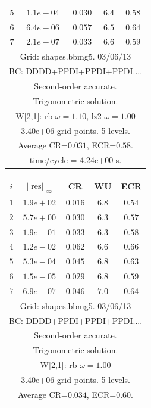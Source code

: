 \begin{table}[hbt]
\begin{center}
{\begin{tabular}{|c|c|c|c|c|}
 $ 5$  & $ 1.1e-04$ & $0.030$ & $ 6.4$ & $0.58$ \\ 
 $ 6$  & $ 6.4e-06$ & $0.057$ & $ 6.5$ & $0.64$ \\ 
 $ 7$  & $ 2.1e-07$ & $0.033$ & $ 6.6$ & $0.59$ \\ 
\hline 
\multicolumn{5}{|c|}{Grid: shapes.bbmg5. 03/06/13}  \\
\multicolumn{5}{|c|}{BC: DDDD+PPDI+PPDI+PPDI....}  \\
\multicolumn{5}{|c|}{Second-order accurate.}  \\
\multicolumn{5}{|c|}{Trigonometric solution.}  \\
\multicolumn{5}{|c|}{W[2,1]: rb $\omega=1.10$, lz2 $\omega=1.00$}  \\
\multicolumn{5}{|c|}{3.40e+06 grid-points. 5 levels.}  \\
\multicolumn{5}{|c|}{Average CR=$0.031$, ECR=$0.58$.}  \\
\multicolumn{5}{|c|}{time/cycle = 4.24e+00 s.}  \\
\hline 
\end{tabular}
\begin{tabular}{|c|c|c|c|c|} \hline 
 $i$   & $\vert\vert\mbox{res}\vert\vert_\infty$  &  CR     &  WU    & ECR  \\   \hline 
 $ 1$  & $ 1.9e+02$ & $0.016$ & $ 6.8$ & $0.54$ \\ 
 $ 2$  & $ 5.7e+00$ & $0.030$ & $ 6.3$ & $0.57$ \\ 
 $ 3$  & $ 1.9e-01$ & $0.033$ & $ 6.3$ & $0.58$ \\ 
 $ 4$  & $ 1.2e-02$ & $0.062$ & $ 6.6$ & $0.66$ \\ 
 $ 5$  & $ 5.3e-04$ & $0.045$ & $ 6.8$ & $0.63$ \\ 
 $ 6$  & $ 1.5e-05$ & $0.029$ & $ 6.8$ & $0.59$ \\ 
 $ 7$  & $ 6.9e-07$ & $0.046$ & $ 7.0$ & $0.64$ \\ 
\hline 
\multicolumn{5}{|c|}{Grid: shapes.bbmg5. 03/06/13}  \\
\multicolumn{5}{|c|}{BC: DDDD+PPDI+PPDI+PPDI....}  \\
\multicolumn{5}{|c|}{Second-order accurate.}  \\
\multicolumn{5}{|c|}{Trigonometric solution.}  \\
\multicolumn{5}{|c|}{W[2,1]: rb $\omega=1.00$}  \\
\multicolumn{5}{|c|}{3.40e+06 grid-points. 5 levels.}  \\
\multicolumn{5}{|c|}{Average CR=$0.034$, ECR=$0.60$.}  \\

\end{tabular}}
\end{center}
\end{table}
